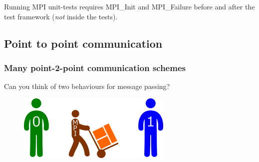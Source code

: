 Running MPI unit-tests requires MPI\_Init and MPI\_Failure before and
after the test framework (\emph{not} inside the tests).

\begin{Shaded}
\begin{Highlighting}[]


\NormalTok{) \{}
     
    \NormalTok{);}
\NormalTok{\}}

   
     
     
\NormalTok{\}}
\end{Highlighting}
\end{Shaded}

\subsection{Point to point
communication}\label{point-to-point-communication}

\subsubsection{Many point-2-point communication
schemes}\label{many-point-2-point-communication-schemes}

Can you think of two behaviours for message passing?

\begin{figure}[htbp]
\centering
\includegraphics{06MPI/figures/mpi.png}
\end{figure}

